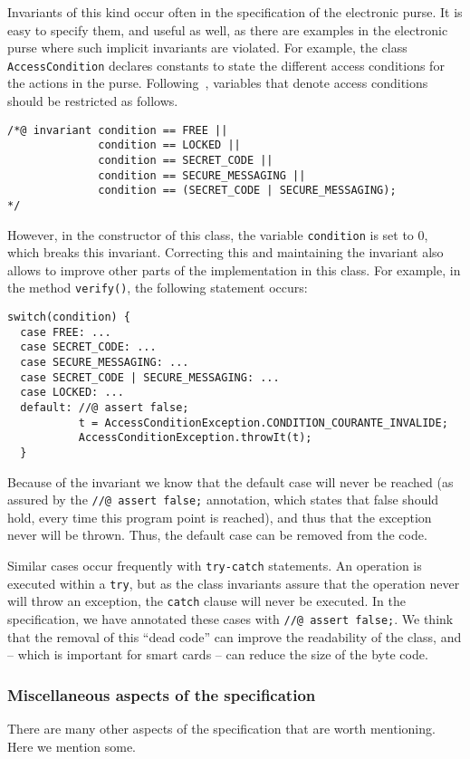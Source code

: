 \documentclass[a4paper]{llncs}
\begin{document}
Invariants of this kind occur often in the specification of the
electronic purse. It is easy to specify them, and useful as well, as
there are examples in the electronic purse where such implicit
invariants are violated.
For example, the class \texttt{AccessCondition} declares constants to
state the different access conditions for the actions in the
purse. Following~\cite{BretagneMGL00}, variables that denote access conditions
should be restricted as follows.
\begin{verbatim}
/*@ invariant condition == FREE ||
              condition == LOCKED ||
              condition == SECRET_CODE ||
              condition == SECURE_MESSAGING ||
              condition == (SECRET_CODE | SECURE_MESSAGING);
*/
\end{verbatim}

However, in the constructor of this class, the variable
\texttt{condition} is set to 0, which breaks this
invariant. Correcting this and maintaining the invariant also allows
to improve other parts of the implementation in this class. For
example, in the method \texttt{verify()}, the following statement
occurs:
\begin{verbatim}
switch(condition) {
  case FREE: ...
  case SECRET_CODE: ...
  case SECURE_MESSAGING: ...
  case SECRET_CODE | SECURE_MESSAGING: ...
  case LOCKED: ...
  default: //@ assert false;
           t = AccessConditionException.CONDITION_COURANTE_INVALIDE;
           AccessConditionException.throwIt(t);
  }
\end{verbatim}
Because of the invariant we know that the default case will never
be reached (as assured by the \texttt{//@ assert false;} annotation,
which states that false should hold, every time this program point is
reached), and thus that the exception never will be thrown. Thus, the
default case can be removed from the code.

Similar cases occur frequently with \texttt{try-catch} statements. An
operation is executed within a \texttt{try}, but as the class invariants
assure that the operation never will throw an exception, the
\texttt{catch} clause will never be executed. In the specification, we 
have annotated these cases with \texttt{//@ assert false;}. We think
that the removal of this ``dead code'' can improve the readability of
the class, and -- which is important for smart cards -- can reduce the 
size of the byte code.


\subsubsection{Miscellaneous aspects of the specification}
There are many other aspects of the specification that are worth
mentioning. Here we mention some.
\end{document}
